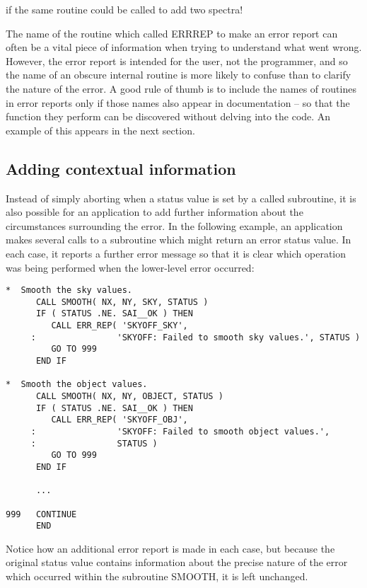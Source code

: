 \documentclass[twoside,11pt]{article}
\newcommand{\xlabel}[1]{}
\renewcommand{\_}{\texttt{\symbol{95}}}
\begin{document}
if the same routine could be called to add two spectra!

The name of the routine which called ERR\_REP to make an error report can
often be a vital piece of information when trying to understand what went
wrong.
However, the error report is intended for the user, not the programmer, and so
the name of an obscure internal routine is more likely to confuse than to
clarify the nature of the error.
A good rule of thumb is to include the names of routines in error reports
only if those names also appear in documentation -- so that the function
they perform can be discovered without delving into the code.
An example of this appears in the next section.


\subsection{\xlabel{adding_contextual_information}Adding contextual information}

Instead of simply aborting when a status value is set by a called
subroutine, it is also possible for an application to add further information
about the circumstances surrounding the error.
In the following example, an application makes several calls to a subroutine
which might return an error status value.
In each case, it reports a further error message so that it is clear which
operation was being performed when the lower-level error occurred:

\begin {small}
\begin{verbatim}
*  Smooth the sky values.
      CALL SMOOTH( NX, NY, SKY, STATUS )
      IF ( STATUS .NE. SAI__OK ) THEN
         CALL ERR_REP( 'SKYOFF_SKY',
     :                'SKYOFF: Failed to smooth sky values.', STATUS )
         GO TO 999
      END IF

*  Smooth the object values.
      CALL SMOOTH( NX, NY, OBJECT, STATUS )
      IF ( STATUS .NE. SAI__OK ) THEN
         CALL ERR_REP( 'SKYOFF_OBJ',
     :                'SKYOFF: Failed to smooth object values.',
     :                STATUS )
         GO TO 999
      END IF

      ...

999   CONTINUE
      END
\end{verbatim}
\end {small}

Notice how an additional error report is made in each case, but because
the original status value contains information about the precise nature of
the error which occurred within the subroutine SMOOTH, it is left unchanged.
\end{document}
